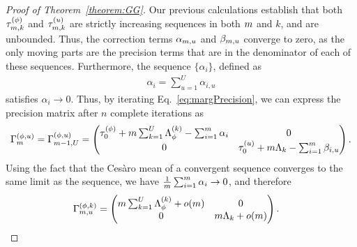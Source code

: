 \begin{proof}[Proof of Theorem~\ref{theorem:GG}]
Our previous calculations establish that both $\tau^{(\phi)}_{m, k}$ and $\tau^{(u)}_{m, k}$ are strictly increasing sequences in both $m$ and $k$, and are unbounded. 
Thus, the correction terms $\alpha_{m, u}$ and $\beta_{m, u}$ converge to zero, as the only moving parts are the precision terms that are in the denominator of each of these sequences. 
Furthermore, the sequence $\{\alpha_i\}$, defined as
\begin{align*}
  \alpha_i = \sum_{u = 1}^U \alpha_{i, u} 
\end{align*}
satisfies $\alpha_i \rightarrow 0$. 
Thus, by iterating Eq.~\ref{eq:margPrecision}, we can express the precision matrix after $n$ complete iterations as
\begin{align*}
  \Gamma^{(\phi, u)}_{m} = \Gamma^{(\phi, u)}_{m-1, U} = \begin{pmatrix}
    \tau^{(\phi)}_{0} + m\sum_{k = 1}^{U}\Lambda^{(k)}_{\phi} - \sum_{i = 1}^m\alpha_{i} & 0 \\
    0 & \tau^{(u)}_{0} + m\Lambda_{k} - \sum_{i = 1}^m \beta_{i, u}
  \end{pmatrix}.
\end{align*}
Using the fact that the Ces\`aro mean of a convergent sequence converges to the same limit as the sequence, we have $\frac{1}{m}\sum_{i = 1}^m \alpha_{i} \rightarrow 0$, and therefore 
\begin{align}
  \Gamma^{(\phi, k)}_{m, u} &= \begin{pmatrix} 
    m\sum_{k = 1}^U \Lambda_{\phi}^{(k)} + o(m) & 0 \\
    0 & m\Lambda_k + o(m)
  \end{pmatrix}. \label{eq:nGamma}
\end{align}


\end{proof}
